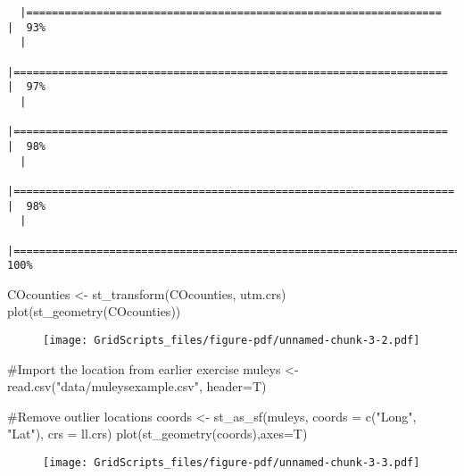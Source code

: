 \documentclass[
  letterpaper,
]{book}
\newenvironment{Shaded}{\begin{snugshade}}{\end{snugshade}}
\newcommand{\AttributeTok}[1]{\textcolor[rgb]{0.40,0.45,0.13}{#1}}
\newcommand{\CommentTok}[1]{\textcolor[rgb]{0.37,0.37,0.37}{#1}}
\newcommand{\FunctionTok}[1]{\textcolor[rgb]{0.28,0.35,0.67}{#1}}
\newcommand{\NormalTok}[1]{\textcolor[rgb]{0.00,0.23,0.31}{#1}}
\newcommand{\OtherTok}[1]{\textcolor[rgb]{0.00,0.23,0.31}{#1}}
\newcommand{\StringTok}[1]{\textcolor[rgb]{0.13,0.47,0.30}{#1}}
\begin{document}
\begin{verbatim}
  |=================================================================     |  93%
  |                                                                            
  |====================================================================  |  97%
  |                                                                            
  |====================================================================  |  98%
  |                                                                            
  |===================================================================== |  98%
  |                                                                            
  |======================================================================| 100%
\end{verbatim}

\begin{Shaded}
\begin{Highlighting}[]
\NormalTok{COcounties }\OtherTok{\textless{}{-}} \FunctionTok{st\_transform}\NormalTok{(COcounties, utm.crs)}
\FunctionTok{plot}\NormalTok{(}\FunctionTok{st\_geometry}\NormalTok{(COcounties))}
\end{Highlighting}
\end{Shaded}

\begin{figure}[H]

{\centering \texttt{[image: GridScripts\_files/figure-pdf/unnamed-chunk-3-2.pdf]}

}

\end{figure}

\begin{Shaded}
\begin{Highlighting}[]
\CommentTok{\#Import the location from earlier exercise}
\NormalTok{muleys }\OtherTok{\textless{}{-}}\FunctionTok{read.csv}\NormalTok{(}\StringTok{"data/muleysexample.csv"}\NormalTok{, }\AttributeTok{header=}\NormalTok{T)}

\CommentTok{\#Remove outlier locations}
\NormalTok{coords }\OtherTok{\textless{}{-}} \FunctionTok{st\_as\_sf}\NormalTok{(muleys, }\AttributeTok{coords =} \FunctionTok{c}\NormalTok{(}\StringTok{"Long"}\NormalTok{, }\StringTok{"Lat"}\NormalTok{), }\AttributeTok{crs =}\NormalTok{ ll.crs)}
\FunctionTok{plot}\NormalTok{(}\FunctionTok{st\_geometry}\NormalTok{(coords),}\AttributeTok{axes=}\NormalTok{T)}
\end{Highlighting}
\end{Shaded}

\begin{figure}[H]

{\centering \texttt{[image: GridScripts\_files/figure-pdf/unnamed-chunk-3-3.pdf]}

}

\end{figure}
\end{document}
